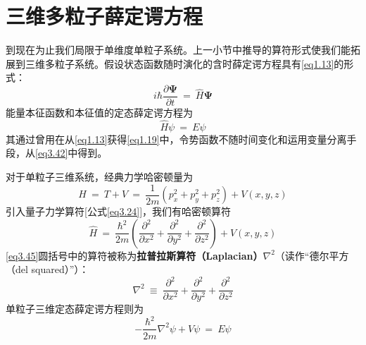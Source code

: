 \documentclass[12pt,a4paper,openany]{ctexbook}
\begin{document}
\section{三维多粒子薛定谔方程}
\begin{flushleft}
    \setlength{\parindent}{2em}
到现在为止我们局限于单维度单粒子系统。上一小节中推导的算符形式使我们能拓展到三维多粒子系统。假设状态函数随时演化的含时薛定谔方程具有\eqref{eq1.13}的形式：
\begin{equation}
    \boxed{i\hbar\frac{\partial\bm{\Psi}}{\partial t}\ =\ \hat{H}\bm{\Psi}} \label{eq3.42}
\end{equation}
能量本征函数和本征值的定态薛定谔方程为
\begin{equation}
    \boxed{\hat{H}\psi\ =\ E\psi} \label{eq3.43}
\end{equation}
其通过曾用在从\eqref{eq1.13}获得\eqref{eq1.19}中，令势函数不随时间变化和运用变量分离手段，从\eqref{eq3.42}中得到。

对于单粒子三维系统，经典力学哈密顿量为
\begin{equation}
    H\ =\ T+V\ =\ \frac{1}{2m}(p_x^2+p_y^2+p_z^2)+V(x,y,z)
\end{equation}
引入量子力学算符[公式\eqref{eq3.24}]，我们有哈密顿算符
\begin{equation}
    \hat{H}\ =\ \frac{\hbar^2}{2m}(\frac{\partial^2}{\partial x^2}+\frac{\partial^2}{\partial y^2}+\frac{\partial^2}{\partial z^2})+V(x,y,z) \label{eq3.45}
\end{equation}
\eqref{eq3.45}圆括号中的算符被称为\textbf{拉普拉斯算符（Laplacian）$\nabla^2$}（读作“德尔平方（del squared）”）：
\begin{equation}
    \boxed{\nabla^2\ \equiv\ \frac{\partial^2}{\partial x^2}+\frac{\partial^2}{\partial y^2}+\frac{\partial^2}{\partial z^2}} \label{eq3.46}
\end{equation}
单粒子三维定态薛定谔方程则为
\begin{equation}
    -\frac{\hbar^2}{2m}\nabla^2\psi+V\psi\ =\ E\psi \label{eq3.47}
\end{equation}


\end{flushleft}
\end{document}
